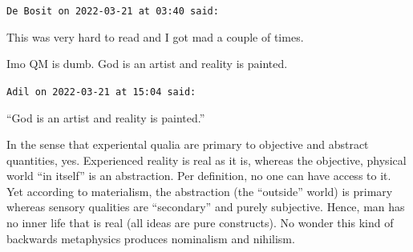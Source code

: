 \begin{footnotesize}
\begin{sffamily}
\texttt{De Bosit on 2022-03-21 at 03:40 said:}

This was very hard to read and I got mad a couple of times.

Imo QM is dumb. God is an artist and reality is painted.

\hfill

\texttt{Adil on 2022-03-21 at 15:04 said:}

``God is an artist and reality is painted.''

In the sense that experiental qualia are primary to objective and abstract quantities, yes. Experienced reality is real as it is, whereas the objective, physical world ``in itself'' is an abstraction. Per definition, no one can have access to it. Yet according to materialism, the abstraction (the ``outside'' world) is primary whereas sensory qualities are ``secondary'' and purely subjective. Hence, man has no inner life that is real (all ideas are pure constructs). No wonder this kind of backwards metaphysics produces nominalism and nihilism.

\end{sffamily}
\end{footnotesize}

